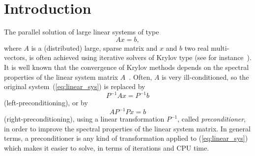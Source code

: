 % 
% 
% 
%  
%  
% 

\section{Introduction}
\label{chap:introduction}

The parallel solution of large linear systems of type
\begin{equation}
\label{eq:linear_sys}
A {x} = {b},
\end{equation}
where $A$ is a (distributed) large, sparse matrix and $x$ and $b$ two real
multi-vectors, is often achieved using iterative solvers of Krylov type (see for
instance~\cite{barret93templates}).
It is well known that the convergence of Krylov methods depends on 
the spectral properties of the linear system matrix
$A$~\cite{axelsson94iterative,saad96iterative,QSS}. Often, $A$ is very
ill-conditioned, so the
original system~(\ref{eq:linear_sys}) is replaced by
\[
P^{-1} A{x} = P^{-1} {b}
\]
(left-preconditioning), or by
\[
A P^{-1} P {x} = {b}
\]
(right-preconditioning), using a linear transformation $P^{-1}$,
called {\sl preconditioner}, in order to improve the spectral properties of
the linear system matrix. In general terms, a preconditioner is any
kind of transformation applied to (\ref{eq:linear_sys}) which makes it
easier to solve, in terms of iterations and CPU time.

